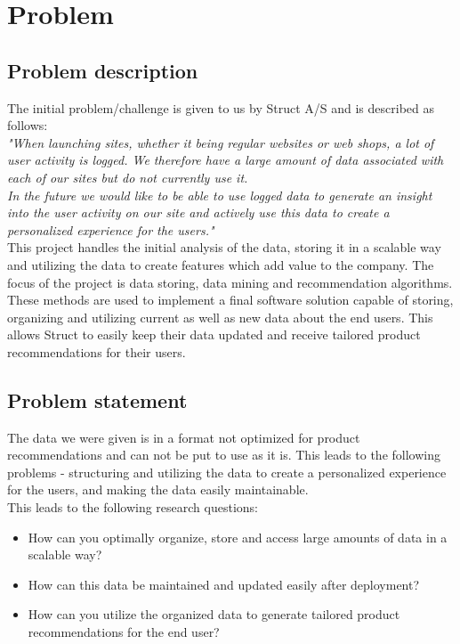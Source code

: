 
\chapter{Problem} %

\label{Chapter1} %


\section{Problem description}

The initial problem/challenge is given to us by Struct A/S and is described as follows: \\

\textit{"When launching sites, whether it being regular websites or web shops, a lot of user activity is logged. We therefore have a large amount of data associated with each of our sites but do not currently use it.} \\
\textit{In the future we would like to be able to use logged data to generate an insight into the user activity on our site and actively use this data to create a personalized experience for the users."} \\

This project handles the initial analysis of the data, storing it in a scalable way and utilizing the data to create features which add value to the company. The focus of the project is data storing, data mining and recommendation algorithms. These methods are used to implement a final software solution capable of storing, organizing and utilizing current as well as new data about the end users. This allows Struct to easily keep their data updated and receive tailored product recommendations for their users.





\section{Problem statement}
The data we were given is in a format not optimized for product recommendations and can not be put to use as it is. This leads to the following problems - structuring and utilizing the data to create a personalized experience for the users, and making the data easily maintainable. \\
This leads to the following research questions:
\begin{itemize}
\item How can you optimally organize, store and access large amounts of data in a scalable way?
\item How can this data be maintained and updated easily after deployment?
\item How can you utilize the organized data to generate tailored product recommendations for the end user?
\end{itemize}
